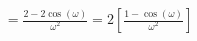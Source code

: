 \documentclass[preview]{standalone}
\begin{document}
\begin{align*}
&=\frac{2-2\cos{(\omega)}}{\omega^{2}} = 2\left[\frac{1-\cos{(\omega)}}{\omega^{2}}\right] \\
\end{align*}
\end{document}
